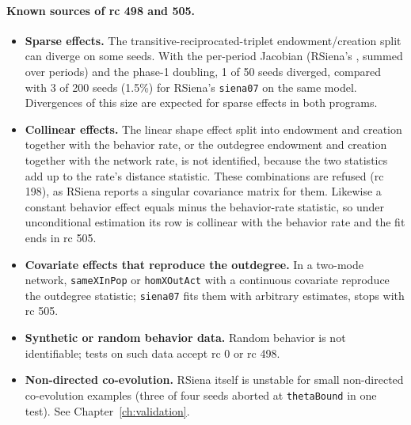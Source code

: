 \paragraph{Known sources of rc 498 and 505.}

\begin{itemize}
\item \textbf{Sparse effects.} The transitive-reciprocated-triplet endowment/creation split can diverge on some seeds. With the per-period Jacobian (RSiena's , summed over periods) and the phase-1 doubling, 1 of 50 seeds diverged, compared with 3 of 200 seeds (1.5\%) for RSiena's \texttt{siena07} on the same model. Divergences of this size are expected for sparse effects in both programs.
\item \textbf{Collinear effects.} The linear shape effect split into endowment and creation together with the behavior rate, or the outdegree endowment and creation together with the network rate, is not identified, because the two statistics add up to the rate's distance statistic. These combinations are refused (rc 198), as RSiena reports a singular covariance matrix for them. Likewise a constant behavior effect equals minus the behavior-rate statistic, so under unconditional estimation its row is collinear with the behavior rate and the fit ends in rc 505.
\item \textbf{Covariate effects that reproduce the outdegree.} In a two-mode network, \texttt{sameXInPop} or \texttt{homXOutAct} with a continuous covariate reproduce the outdegree statistic; \texttt{siena07} fits them with arbitrary estimates, \nwsaom{} stops with rc 505.
\item \textbf{Synthetic or random behavior data.} Random behavior is not identifiable; tests on such data accept rc 0 or rc 498.
\item \textbf{Non-directed co-evolution.} RSiena itself is unstable for small non-directed co-evolution examples (three of four seeds aborted at \texttt{thetaBound} in one test). See Chapter~\ref{ch:validation}.
\end{itemize}

